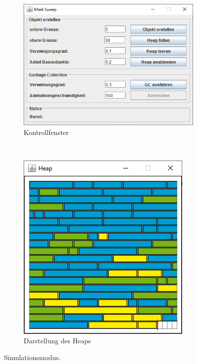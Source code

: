 \begin{figure}[h]
	\centering
	\begin{subfigure}[t]{0.6\textwidth}
		\centering
		\includegraphics[scale=0.5]{img/gui/simulation-control.png}
		\caption{Kontrollfenster}
	\end{subfigure}~\hspace{0.25cm}~
	\begin{subfigure}[t]{0.35\textwidth}
		\centering
		\includegraphics[scale=0.5]{img/gui/simulation-canvas.png}
		\caption{Darstellung des Heaps}
	\end{subfigure}
	\caption[Simulationsmodus]{Simulationsmodus.}
	\label{fig:app-simulation}
\end{figure}

